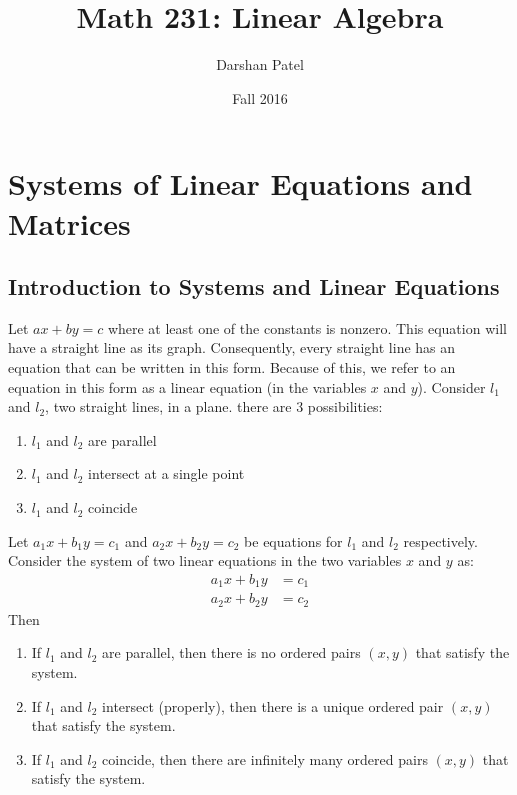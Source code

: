 \documentclass[12pt]{article}
\begin{document}
\theoremstyle{definition}
\newtheorem{theorem}{Theorem}[section]
\newtheorem{definition}{Definition}[section]
\newtheorem{example}{Example}[section]

\title{Math 231: Linear Algebra}
\author{Darshan Patel}
\date{Fall 2016}
\maketitle

\tableofcontents

\section{Systems of Linear Equations and Matrices}
\subsection{Introduction to Systems and Linear Equations}
Let $ ax + by = c $ where at least one of the constants is nonzero. This equation will have a straight line as its graph. Consequently, every straight line has an equation that can be written in this form. Because of this, we refer to an equation in this form as a linear equation (in the variables $x$ and $y$). \newline
Consider $l_1$ and $l_2$, two straight lines, in a plane. there are 3 possibilities: 
\begin{enumerate}
\item $l_1$ and $l_2$ are parallel
\item $l_1$ and $l_2$ intersect at a single point
\item $l_1$ and $l_2$ coincide \end{enumerate}
Let $a_1x + b_1y = c_1 $ and $ a_2x + b_2y = c_2$ be equations for $l_1$ and $l_2$ respectively. Consider the system of two linear equations in the two variables $x$ and $y$ as: $$ \begin{aligned}
 a_1x + b_1y &= c_1 \\ a_2x + b_2y &= c_2 \end{aligned} $$
Then 
\begin{enumerate} 
\item If $l_1$ and $l_2$ are parallel, then there is no ordered pairs $(x, y)$ that satisfy the system.
\item If $l_1$ and $l_2$ intersect (properly), then there is a unique ordered pair $(x, y)$ that satisfy the system. 
\item If $l_1$ and $l_2$ coincide, then there are infinitely many ordered pairs $(x, y)$ that satisfy the system. \end{enumerate} 
\end{document}
